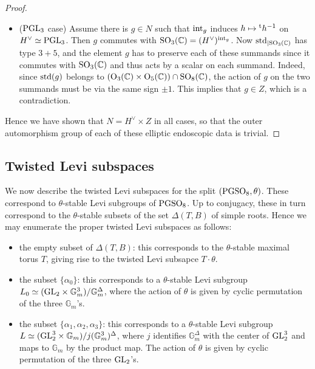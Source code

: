 \documentclass[11pt]{amsart}
\theoremstyle{plain}
\numberwithin{equation}{section}
\newcommand{\C}{\mathbb C}
\def\PGSO{{\rm PGSO}}
\def\GL{{\rm GL}}
\def\SO{{\rm SO}}
\def\C{{\bf C}}
\def\C{{\mathbb C}}
\begin{document}
\begin{proof}
\begin{itemize}
\item[-] (${\rm PGL}_3$ case) Assume there is $g \in N$ such that ${\rm int}_g$ induces $h \mapsto {}^{\rm t}h^{-1}$ on $H^\vee \simeq {\rm PGL}_3$. Then $g$ commutes with 
${\rm SO}_3(\C) = (H^\vee)^{{\rm int}_g}$. Now  ${\rm std}_{|{\rm SO}_3(\C)}$ has type $3+5$, and the element $g$ has to preserve each of these summands since it commutes with $\SO_3(\C)$ and thus acts by a scalar  on each summand. Indeed, since ${\rm std}(g)$ belongs to $({\rm O}_3(\C) \times  {\rm O}_5(\C)) \cap\SO_8(\C)$, 
the action of  $g$ on the two summands must be via the same sign $\pm 1$. 
This implies that $g \in Z$, which is a contradiction.
\end{itemize}
\vskip 5pt

\noindent Hence  we have shown that $N=H^\vee \times Z$ in all cases, so that the outer automorphism group of each of  these elliptic endoscopic data is trivial.
 \end{proof}
 \vskip 5pt
 

 \subsection{\bf Twisted Levi subspaces} \label{SS:twisted Levi}
We now describe  the twisted Levi subspaces for the split $(\PGSO_8, \theta)$. These correspond to $\theta$-stable Levi subgroups of $\PGSO_8$. 
Up to conjugacy, these in turn correspond to the $\theta$-stable subsets of the set $\Delta(T,B)$ of simple roots.  
Hence we may enumerate the proper twisted Levi subspaces as follows:
\vskip 5pt

\begin{itemize}
\item the empty subset of $\Delta(T,B)$: this corresponds to the $\theta$-stable maximal torus $T$, giving rise to the twisted Levi subsapce $T \cdot \theta$.
\vskip 5pt

\item the subset $\{ \alpha_0 \}$: this corresponds to a $\theta$-stable  Levi subgroup $L_0 \simeq  (\GL_2 \times \mathbb{G}_m^3)/ \mathbb{G}_m^{\Delta}$, where the action of $\theta$ is given by cyclic permutation of the three $\mathbb{G}_m$'s.

\vskip 5pt

\item the subset $\{\alpha_1, \alpha_2, \alpha_3\}$: this corresponds to a $\theta$-stable Levi subgroup $L \simeq (\GL_2 ^3 \times \mathbb{G}_m)/ j(\mathbb{G}_m^3)^{\Delta}$, where $j$ identifies $\mathbb{G}_m^{\Delta}$  with the center of $\GL_2^3$ and maps to $\mathbb{G}_m$ by the product map. The action of $\theta$ is given by cyclic permutation of the three $\GL_2$'s. 
\end{itemize}
\vskip 5pt
\end{document}

